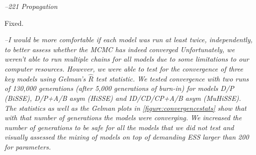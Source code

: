 \documentclass[11pt]{article}
\renewenvironment{quote}{\bigskip\noindent\itshape\ignorespaces}{\smallskip}
\begin{document}
\begin{quote}
--221  Propagation
\end{quote}

Fixed.

\begin{quote}
--I would be more comfortable if each model was run at least twice, independently, to better assess whether the MCMC has indeed converged
\end{quote}
Unfortunately, we weren't able to run multiple chains for all models due to some limitations to our computer resources. However, we were able to test for the convergence of  three key models using Gelman's $\hat{R}$ test statistic. We tested convergence with two runs of 130,000 generations (after 5,000 generations of burn-in) for models D/P (BiSSE), D/P+A/B asym (HiSSE) and ID/CD/CP+A/B asym (MuHiSSE). The statistics as well as the Gelman plots in  \ref{figure:convergencestats} show that with that number of generations the models were converging. We increased the number of generations to be safe for all the models that we did not test and visually assessed the mixing of  models on top of demanding ESS larger than 200 for parameters. 
\end{document}
